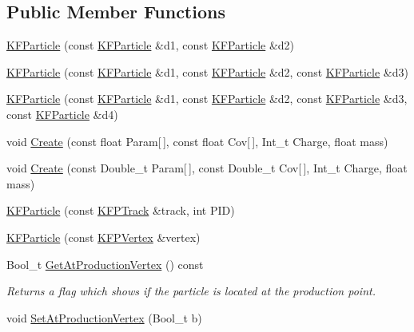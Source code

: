 \subsection*{Public Member Functions}
\begin{DoxyCompactItemize}
\item 
\hyperlink{classKFParticle_a68828423bef2ed7e280698a0cc5704c2}{K\+F\+Particle} (const \hyperlink{classKFParticle}{K\+F\+Particle} \&d1, const \hyperlink{classKFParticle}{K\+F\+Particle} \&d2)
\item 
\hyperlink{classKFParticle_ad77dfee950a5c9daa80efa08c84e85cb}{K\+F\+Particle} (const \hyperlink{classKFParticle}{K\+F\+Particle} \&d1, const \hyperlink{classKFParticle}{K\+F\+Particle} \&d2, const \hyperlink{classKFParticle}{K\+F\+Particle} \&d3)
\item 
\hyperlink{classKFParticle_a632873e701f93a69879afb7296dd6f40}{K\+F\+Particle} (const \hyperlink{classKFParticle}{K\+F\+Particle} \&d1, const \hyperlink{classKFParticle}{K\+F\+Particle} \&d2, const \hyperlink{classKFParticle}{K\+F\+Particle} \&d3, const \hyperlink{classKFParticle}{K\+F\+Particle} \&d4)
\item 
void \hyperlink{classKFParticle_a688e43bc457ac9cc866e7e4a86c64bed}{Create} (const float Param\mbox{[}$\,$\mbox{]}, const float Cov\mbox{[}$\,$\mbox{]}, Int\+\_\+t Charge, float mass)
\item 
void \hyperlink{classKFParticle_a01fe4b3048c5c5337565a9b3da127c3d}{Create} (const Double\+\_\+t Param\mbox{[}$\,$\mbox{]}, const Double\+\_\+t Cov\mbox{[}$\,$\mbox{]}, Int\+\_\+t Charge, float mass)
\item 
\hyperlink{classKFParticle_ae6c3f778dbbbd47cef6bd56cbf9ce714}{K\+F\+Particle} (const \hyperlink{classKFPTrack}{K\+F\+P\+Track} \&track, int P\+ID)
\item 
\hyperlink{classKFParticle_aadf37a45429b3683bee536e30300a404}{K\+F\+Particle} (const \hyperlink{classKFPVertex}{K\+F\+P\+Vertex} \&vertex)
\item 
Bool\+\_\+t \hyperlink{classKFParticle_a22358b18680f63474c0329163c13080e}{Get\+At\+Production\+Vertex} () const \hypertarget{classKFParticle_a22358b18680f63474c0329163c13080e}{}\label{classKFParticle_a22358b18680f63474c0329163c13080e}

\begin{DoxyCompactList}\small\item\em Returns a flag which shows if the particle is located at the production point. \end{DoxyCompactList}\item 
void \hyperlink{classKFParticle_a2a1c4001b07352ad6aa73065f502957a}{Set\+At\+Production\+Vertex} (Bool\+\_\+t b)\hypertarget{classKFParticle_a2a1c4001b07352ad6aa73065f502957a}{}\label{classKFParticle_a2a1c4001b07352ad6aa73065f502957a}


\end{DoxyCompactItemize}
